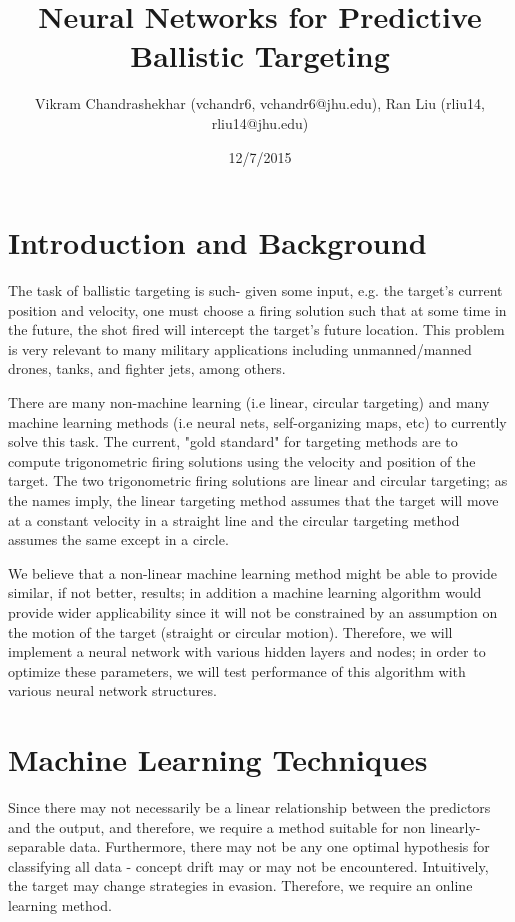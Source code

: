 \documentclass[11pt]{article}
\title{Neural Networks for Predictive Ballistic Targeting}
\author{Vikram Chandrashekhar (vchandr6, vchandr6@jhu.edu), Ran Liu (rliu14, rliu14@jhu.edu)}
\date{12/7/2015}
\begin{document}
\maketitle

\section{Introduction and Background}
The task of ballistic targeting is such- given some input, e.g. the target's current position and velocity, one must choose a firing solution such that at some time in the future, the shot fired will intercept the target's future location. This problem is very relevant to many military applications including unmanned/manned drones, tanks, and fighter jets, among others.

There are many non-machine learning (i.e linear, circular targeting) and many machine learning methods (i.e neural nets, self-organizing maps, etc) to currently solve this task. The current, "gold standard" for targeting methods are to compute trigonometric firing solutions using the velocity and position of the target. The two trigonometric firing solutions are linear and circular targeting; as the names imply, the linear targeting method assumes that the target will move at a constant velocity in a straight line and the circular targeting method assumes the same except in a circle.



We believe that a non-linear machine learning method might be able to provide similar, if not better, results; in addition a machine learning algorithm would provide wider applicability since it will not be constrained by an assumption on the motion of the target (straight or circular motion). Therefore, we will implement a neural network with various hidden layers and nodes; in order to optimize these parameters, we will test performance of this algorithm with various neural network structures. 

\section{Machine Learning Techniques}
Since there may not necessarily be a linear relationship between the predictors and the output, and therefore, we require a method suitable for non linearly-separable data. Furthermore, there may not be any one optimal hypothesis for classifying all data - concept drift may or may not be encountered. Intuitively, the target may change strategies in evasion. Therefore, we require an online learning method.
\end{document}
